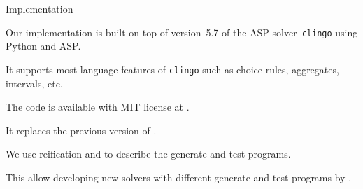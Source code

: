 \documentclass[aspectratio=169,svgnames,xcolor=table,t]{beamer}
\begin{document}
\begin{frame}[c]{Implementation}
    \begin{myitemize}
        \item[] Our implementation is built on top of version~5.7 of the ASP solver~\texttt{clingo} using Python and ASP.%
        \begin{myitemize}
            \item It supports most language features of \texttt{clingo} such as choice rules, aggregates, intervals, etc.
            
            \item The code is available with MIT license at .
            
            \item It replaces the previous version of .
                        
            \item We use reification and  to describe the generate and test programs.
            
            \item This allow developing new solvers with different generate and test programs by .
        \end{myitemize}
    \end{myitemize}
\end{frame}
\end{document}
